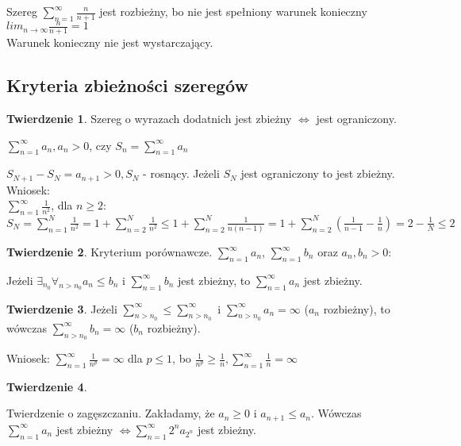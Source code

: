 \documentclass{article}
\theoremstyle{definition}
\theoremstyle{definition}
\newtheorem{tw}{Twierdzenie}[subsection]
\theoremstyle{definition}
\theoremstyle{definition}
\begin{document}
Szereg $\sum_{n=1}^{\infty} \frac{n}{n+1}$ jest rozbieżny, bo nie jest spełniony warunek konieczny\\ $lim_{n\rightarrow \infty} \frac{n}{n+1}=1$\\
Warunek konieczny nie jest wystarczający.

\subsection{Kryteria zbieżności szeregów}

\begin{tw}
    Szereg o wyrazach dodatnich jest zbieżny $\iff$ jest ograniczony.\\
    \begin{center}
        $\sum_{n=1}^{\infty} a_n, a_n>0$, czy $S_n = \sum_{n=1}^{\infty} a_n$
    \end{center}
    $S_{N+1}-S_{N}=a_{n+1} > 0, S_N$ - rosnący. Jeżeli $S_N$ jest ograniczony to jest zbieżny.\\
    Wniosek:\\
    $\sum_{n=1}^{\infty} \frac{1}{n^2}$, dla $n\geq 2$:\\
    $S_N=\sum_{n=1}^{N} \frac{1}{n^2}=1+\sum_{n=2}^{N} \frac{1}{n^2}\leq 1 + \sum_{n=2}^{N} \frac{1}{n(n-1)} = 1 + \sum_{n=2}^{N} (\frac{1}{n-1} - \frac{1}{n}) = 2 - \frac{1}{N} \leq 2$
\end{tw}

\begin{tw}
    Kryterium porównawcze. $\sum_{n=1}^{\infty} a_n$, $\sum_{n=1}^{\infty} b_n$ oraz $a_n, b_n > 0$:
    \begin{center}
    Jeżeli $\exists_{n_0}\forall_{n>n_0} a_n\leq b_n$ i $\sum_{n=1}^{\infty} b_n$ jest zbieżny, to $\sum_{n=1}^{\infty} a_n$ jest zbieżny.\\
    \end{center}
\end{tw}

\begin{tw}
    Jeżeli $\sum_{n>n_0}^{\infty} \leq \sum_{n>n_0}^{\infty}$ i $\sum_{n>n_0}^{\infty} a_n = \infty$ ($a_n$ rozbieżny),
    to wówczas $\sum_{n>n_0}^{\infty} b_n = \infty$ ($b_n$ rozbieżny).
\end{tw}

Wniosek: $\sum_{n=1}^{\infty} \frac{1}{n^p} = \infty$ dla $p\leq 1$, bo $\frac{1}{n^p} \geq \frac{1}{n}, \sum_{n=1}^{\infty} \frac{1}{n} = \infty$\\

\begin{tw}
    \begin{center}
    Twierdzenie o zagęszczaniu. Zakładamy, że $a_n\geq 0$ i $a_{n+1} \leq a_n$. Wówczas $\sum_{n=1}^{\infty} a_n$ jest zbieżny $\iff \sum_{n=1}^{\infty} 2^n a_{2^n}$ jest zbieżny.
    \end{center}
\end{tw}
\end{document}
